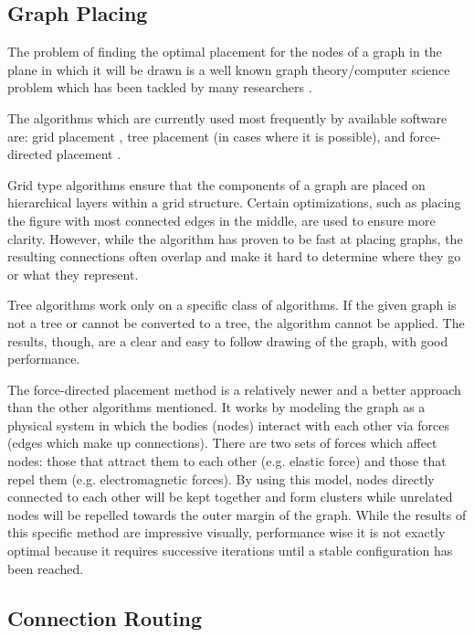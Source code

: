 \subsection{Graph Placing}

The problem of finding the optimal placement for the nodes of a graph in the plane
in which it will be drawn is a well known graph theory/computer science problem
which has been tackled by many researchers \cite{gansner2005graph}.

The algorithms which are currently used most frequently by available software are:
grid placement \cite{tamassia1987embedding}, tree placement (in cases where it is possible), and force-directed placement \cite{hu2005efficient}.

Grid type algorithms ensure that the components of a graph are placed on hierarchical layers within a
grid structure. Certain optimizations, such as placing the figure with most connected edges in the middle,
are used to ensure more clarity. However, while the algorithm has proven to be fast at placing graphs,
the resulting connections often overlap and make it hard to determine where they go or what they represent.

Tree algorithms work only on a specific class of algorithms. If the given graph is not a tree or cannot be
converted to a tree, the algorithm cannot be applied. The results, though, are a clear and easy to follow
drawing of the graph, with good performance.

The force-directed placement method is a relatively newer and a better approach than the other algorithms mentioned.
It works by modeling the graph as a physical system in which the bodies (nodes) interact with each other via
forces (edges which make up connections). There are two sets of forces which affect nodes: those that attract
them to each other (e.g. elastic force) and those that repel them (e.g. electromagnetic forces). By using
this model, nodes directly connected to each other will be kept together and form clusters while unrelated
nodes will be repelled towards the outer margin of the graph. While the results of this specific method are
impressive visually, performance wise it is not exactly optimal because it requires successive iterations
until a stable configuration has been reached.

\subsection{Connection Routing}

